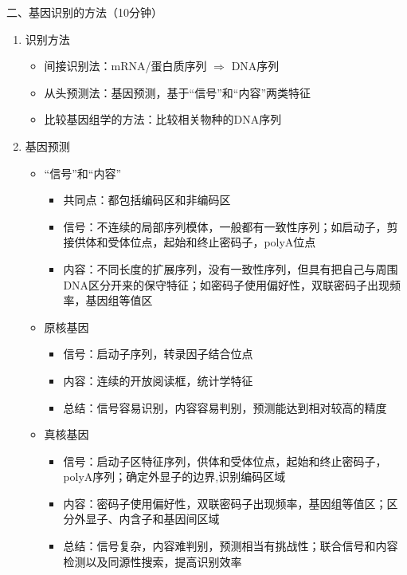 \documentclass{TIJMUjiaoanSY}
\begin{document}
\vspace*{0.2cm}
\noindent
二、基因识别的方法（10分钟）
\begin{enumerate}
  \item 识别方法
  \begin{itemize}
    \item 间接识别法：mRNA/蛋白质序列 $\Rightarrow$ DNA序列
    \item 从头预测法：基因预测，基于“信号”和“内容”两类特征
    \item 比较基因组学的方法：比较相关物种的DNA序列
  \end{itemize}
  \item 基因预测
  \begin{itemize}
    \item “信号”和“内容”
    \begin{itemize}
      \item 共同点：都包括编码区和非编码区
      \item 信号：不连续的局部序列模体，一般都有一致性序列；如启动子，剪接供体和受体位点，起始和终止密码子，polyA位点
      \item 内容：不同长度的扩展序列，没有一致性序列，但具有把自己与周围DNA区分开来的保守特征；如密码子使用偏好性，双联密码子出现频率，基因组等值区
    \end{itemize}
    \item 原核基因
    \begin{itemize}
      \item 信号：启动子序列，转录因子结合位点
      \item 内容：连续的开放阅读框，统计学特征
      \item 总结：信号容易识别，内容容易判别，预测能达到相对较高的精度
    \end{itemize}
    \item 真核基因
    \begin{itemize}
      \item 信号：启动子区特征序列，供体和受体位点，起始和终止密码子，polyA序列；确定外显子的边界,识别编码区域
      \item 内容：密码子使用偏好性，双联密码子出现频率，基因组等值区；区分外显子、内含子和基因间区域
      \item 总结：信号复杂，内容难判别，预测相当有挑战性；联合信号和内容检测以及同源性搜索，提高识别效率
    \end{itemize}
  \end{itemize}
\end{enumerate}
\end{document}
